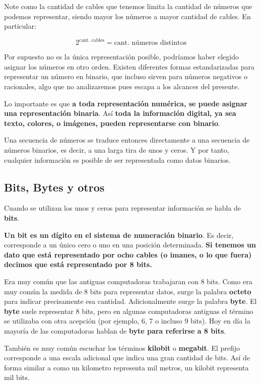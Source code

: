 Note como la cantidad de cables que tenemos limita la cantidad de números que
podemos representar, siendo mayor los números a mayor cantidad de cables. En
particular:

\begin{equation}
    2^{\text{cant. cables}} = \text{cant. números distintos}
\end{equation}

Por supuesto no es la única representación posible, podríamos haber elegido
asignar los números en otro orden. Existen diferentes formas estandarizadas
para representar un número en binario, que incluso sirven para números
negativos o racionales, algo que no analizaremos pues escapa a los alcances del
presente.

Lo importante es que \textbf{a toda representación numérica, se puede asignar
una representación binaria}. Así \textbf{toda la información digital, ya sea
texto, colores, o imágenes, pueden representarse con binario}.\autocite[p. 17]{white_2015}

Una secuencia de números se traduce entonces directamente a una secuencia de
números binarios, es decir, a una larga tira de unos y ceros. Y por tanto,
cualquier información es posible de ser representada como datos binarios.

\subsection{Bits, Bytes y otros}
Cuando se utilizan los unos y ceros para representar información se habla de
\textbf{bits}.

\textbf{Un bit es un dígito en el sistema de numeración binario}. Es decir,
corresponde a un único cero o uno en una posición determinada. \textbf{Si
tenemos un dato que está representado por ocho cables (o imanes, o lo que fuera)
decimos que está representado por 8 bits.}

Era muy común que las antiguas computadoras trabajaran con 8 bits. Como era muy
común la medida de 8 bits para representar datos, surge la palabra \textbf{octeto}
para indicar precisamente esa cantidad. Adicionalmente surge la palabra
\textbf{byte}. El \textbf{byte} suele representar 8 bits, pero en algunas
computadoras antiguas el término se utilizaba con otra acepción (por ejemplo,
6, 7 o incluso 9 bits). Hoy en día la mayoría de las computadoras hablan de
\textbf{byte para referirse a 8 bits}.

También es muy común escuchar los términos \textbf{kilobit} o \textbf{megabit}.
El prefijo corresponde a una escala adicional que indica una gran cantidad de
bits. Así de forma similar a como un kilometro representa mil metros, un kilobit
representa mil bits.

